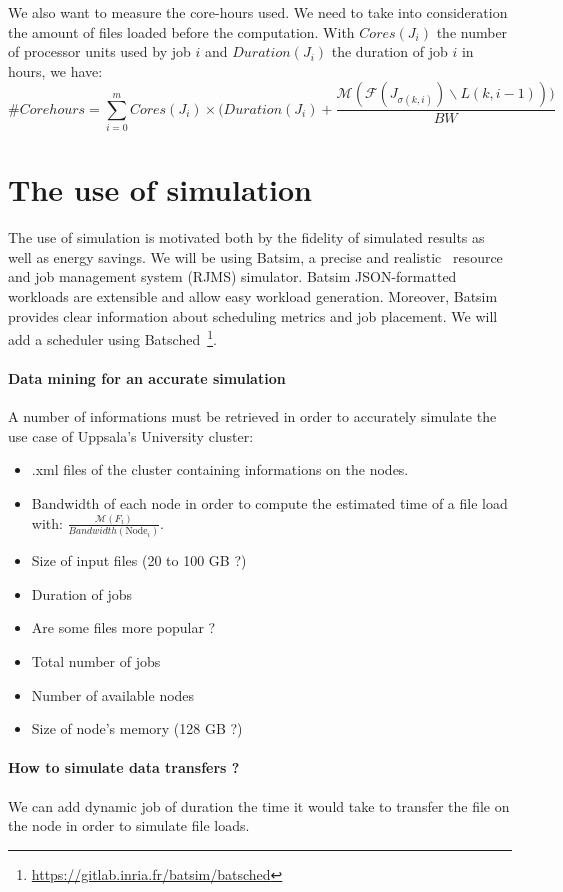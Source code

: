 \documentclass[a4paper]{article}
\newcommand{\Node}[1]{\ensuremath{\mathrm{Node}_{#1}}\xspace}
\newcommand{\inputs}{\ensuremath{\mathcal{F}}\xspace}
\newcommand{\memory}{\ensuremath{\mathcal{M}}\xspace}
\newcommand{\duration}{\mathit{Duration}\xspace}
\newcommand{\bandwidth}{\mathit{BW}\xspace}
\newcommand{\core}{\mathit{Cores}\xspace}
\newcommand{\live}{\ensuremath{L}\xspace}
\begin{document}
We also want to measure the core-hours used. We need to take into consideration the amount of files loaded before the computation.
With $\core(J_i)$ the number of processor units used by job $i$ and $\duration(J_i)$ the duration of job $i$ in hours, we have:
$$
	\#Corehours = \sum^{m}_{i = 0} \core(J_i) \times (\duration(J_i) + \frac{\memory(\inputs\left(J_{\sigma(k,i)}\right) \backslash \live(k,i-1)))}{\bandwidth}
$$

\section{The use of simulation}

The use of simulation is motivated both by the fidelity of simulated results as well as energy savings. 
We will be using Batsim, a precise and realistic~\cite{Batsim} resource and job management system (RJMS) simulator.
Batsim JSON-formatted workloads are extensible and allow easy workload generation. 
Moreover, Batsim provides clear information about scheduling metrics and job placement.
We will add a scheduler using Batsched~\footnote{\url{https://gitlab.inria.fr/batsim/batsched}}.

\paragraph{Data mining for an accurate simulation}
A number of informations must be retrieved in order to accurately 
simulate the use case of Uppsala's University cluster:
\begin{itemize}
	\item	.xml files of the cluster containing informations on the nodes.
	\item	Bandwidth of each node in order to compute the estimated time of a file load with: $\frac{\memory(F_i)}{\mathit{Bandwidth(\Node{i})}}$.
	\item	Size of input files (20 to 100 GB ?)
	\item	Duration of jobs
	\item	Are some files more popular ?
	\item	Total number of jobs
	\item	Number of available nodes
	\item	Size of node's memory (128 GB ?)
\end{itemize}

\paragraph{How to simulate data transfers ?}
We can add dynamic job of duration the time it would take to transfer the file on the node in order
to simulate file loads.

\printbibliography
\end{document}
